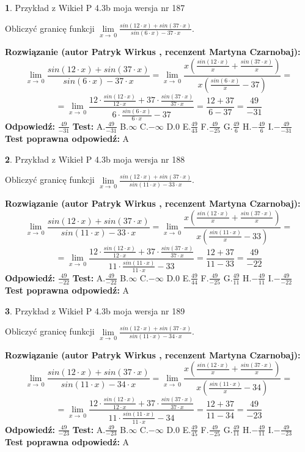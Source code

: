 \documentclass[12pt, a4paper]{article}
\theoremstyle{definition} %
\newtheorem{zad}{}
\newcommand{\zadStart}[1]{\begin{zad}#1\newline}
\newcommand{\zadStop}{\end{zad}}
\newcommand{\rozwStart}[2]{\noindent \textbf{Rozwiązanie (autor #1 , recenzent #2): }\newline}
\newcommand{\rozwStop}{\newline}
\newcommand{\odpStart}{\noindent \textbf{Odpowiedź:}\newline}
\newcommand{\odpStop}{\newline}
\newcommand{\testStart}{\noindent \textbf{Test:}\newline}
\newcommand{\testStop}{\newline}
\newcommand{\kluczStart}{\noindent \textbf{Test poprawna odpowiedź:}\newline}
\newcommand{\kluczStop}{\newline}
\begin{document}
\zadStart{Przykład z Wikieł P 4.3b moja wersja nr 187}


Obliczyć granicę funkcji $\lim\limits_{x\to\ 0}\frac{sin(12 \cdot x)+sin(37 \cdot x)}{sin(6 \cdot x)-37 \cdot x}$.
\zadStop
\rozwStart{Patryk Wirkus}{Martyna Czarnobaj}
$$\lim\limits_{x\to\ 0}\frac{sin(12 \cdot x)+sin(37 \cdot x)}{sin(6 \cdot x)-37 \cdot x}=\lim\limits_{x\to\ 0}\frac{x(\frac{sin(12 \cdot x)}{x}+\frac{sin(37 \cdot x)}{x})}{x(\frac{sin(6 \cdot x)}{x}-37)}=$$
$$=\lim\limits_{x\to\ 0}\frac{12 \cdot \frac{sin(12 \cdot x)}{12 \cdot x}+37 \cdot \frac{sin(37 \cdot x)}{37 \cdot x}}{6 \cdot \frac{sin(6 \cdot x)}{6 \cdot x}-37}=\frac{12+37}{6-37} = \frac{49}{-31}$$
\rozwStop
\odpStart
$\frac{49}{-31}$
\odpStop
\testStart
A.$\frac{49}{-31}$
B.$\infty$
C.$-\infty$
D.$0$
E.$\frac{49}{43}$
F.$\frac{49}{-25}$
G.$\frac{49}{6}$
H.$-\frac{49}{6}$
I.$-\frac{49}{-31}$
\testStop
\kluczStart
A
\kluczStop



\zadStart{Przykład z Wikieł P 4.3b moja wersja nr 188}


Obliczyć granicę funkcji $\lim\limits_{x\to\ 0}\frac{sin(12 \cdot x)+sin(37 \cdot x)}{sin(11 \cdot x)-33 \cdot x}$.
\zadStop
\rozwStart{Patryk Wirkus}{Martyna Czarnobaj}
$$\lim\limits_{x\to\ 0}\frac{sin(12 \cdot x)+sin(37 \cdot x)}{sin(11 \cdot x)-33 \cdot x}=\lim\limits_{x\to\ 0}\frac{x(\frac{sin(12 \cdot x)}{x}+\frac{sin(37 \cdot x)}{x})}{x(\frac{sin(11 \cdot x)}{x}-33)}=$$
$$=\lim\limits_{x\to\ 0}\frac{12 \cdot \frac{sin(12 \cdot x)}{12 \cdot x}+37 \cdot \frac{sin(37 \cdot x)}{37 \cdot x}}{11 \cdot \frac{sin(11 \cdot x)}{11 \cdot x}-33}=\frac{12+37}{11-33} = \frac{49}{-22}$$
\rozwStop
\odpStart
$\frac{49}{-22}$
\odpStop
\testStart
A.$\frac{49}{-22}$
B.$\infty$
C.$-\infty$
D.$0$
E.$\frac{49}{44}$
F.$\frac{49}{-25}$
G.$\frac{49}{11}$
H.$-\frac{49}{11}$
I.$-\frac{49}{-22}$
\testStop
\kluczStart
A
\kluczStop



\zadStart{Przykład z Wikieł P 4.3b moja wersja nr 189}


Obliczyć granicę funkcji $\lim\limits_{x\to\ 0}\frac{sin(12 \cdot x)+sin(37 \cdot x)}{sin(11 \cdot x)-34 \cdot x}$.
\zadStop
\rozwStart{Patryk Wirkus}{Martyna Czarnobaj}
$$\lim\limits_{x\to\ 0}\frac{sin(12 \cdot x)+sin(37 \cdot x)}{sin(11 \cdot x)-34 \cdot x}=\lim\limits_{x\to\ 0}\frac{x(\frac{sin(12 \cdot x)}{x}+\frac{sin(37 \cdot x)}{x})}{x(\frac{sin(11 \cdot x)}{x}-34)}=$$
$$=\lim\limits_{x\to\ 0}\frac{12 \cdot \frac{sin(12 \cdot x)}{12 \cdot x}+37 \cdot \frac{sin(37 \cdot x)}{37 \cdot x}}{11 \cdot \frac{sin(11 \cdot x)}{11 \cdot x}-34}=\frac{12+37}{11-34} = \frac{49}{-23}$$
\rozwStop
\odpStart
$\frac{49}{-23}$
\odpStop
\testStart
A.$\frac{49}{-23}$
B.$\infty$
C.$-\infty$
D.$0$
E.$\frac{49}{45}$
F.$\frac{49}{-25}$
G.$\frac{49}{11}$
H.$-\frac{49}{11}$
I.$-\frac{49}{-23}$
\testStop
\kluczStart
A
\kluczStop
\end{document}
